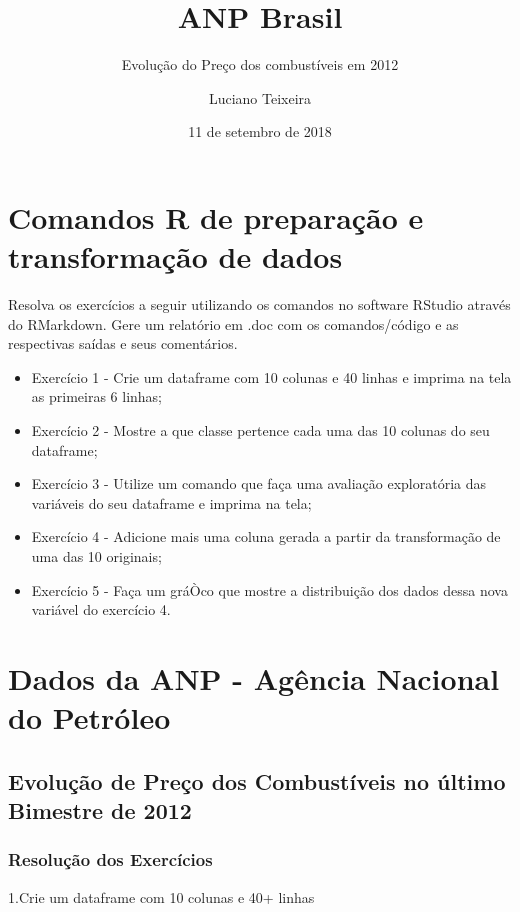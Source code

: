 \documentclass[]{article}
\title{ANP Brasil}
\subtitle{Evolução do Preço dos combustíveis em 2012}
\author{Luciano Teixeira}
\date{11 de setembro de 2018}
\providecommand{\tightlist}{%
  \setlength{\itemsep}{0pt}\setlength{\parskip}{0pt}}
\begin{document}
\maketitle

\section{Comandos R de preparação e transformação de
dados}\label{comandos-r-de-preparacao-e-transformacao-de-dados}

Resolva os exercícios a seguir utilizando os comandos no software
RStudio através do RMarkdown. Gere um relatório em .doc com os
comandos/código e as respectivas saídas e seus comentários.

\begin{itemize}
\tightlist
\item
  Exercício 1 - Crie um dataframe com 10 colunas e 40 linhas e imprima
  na tela as primeiras 6 linhas;
\item
  Exercício 2 - Mostre a que classe pertence cada uma das 10 colunas do
  seu dataframe;
\item
  Exercício 3 - Utilize um comando que faça uma avaliação exploratória
  das variáveis do seu dataframe e imprima na tela;
\item
  Exercício 4 - Adicione mais uma coluna gerada a partir da
  transformação de uma das 10 originais;
\item
  Exercício 5 - Faça um gráÒco que mostre a distribuição dos dados dessa
  nova variável do exercício 4.
\end{itemize}

\section{Dados da ANP - Agência Nacional do
Petróleo}\label{dados-da-anp---agencia-nacional-do-petroleo}

\subsection{Evolução de Preço dos Combustíveis no último Bimestre de
2012}\label{evolucao-de-preco-dos-combustiveis-no-ultimo-bimestre-de-2012}

\subsubsection{Resolução dos Exercícios}\label{resolucao-dos-exercicios}

1.Crie um dataframe com 10 colunas e 40+ linhas
\end{document}
